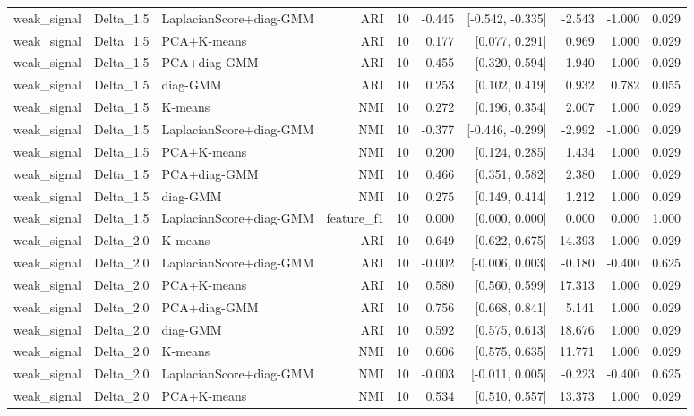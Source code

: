 \begin{table}[t]
\begin{tabular}{lllrrrrrr}
weak\_signal & Delta\_1.5 & LaplacianScore+diag-GMM & ARI & 10 & -0.445 & [-0.542, -0.335] & -2.543 & -1.000 & 0.029 \\
weak\_signal & Delta\_1.5 & PCA+K-means & ARI & 10 & 0.177 & [0.077, 0.291] & 0.969 & 1.000 & 0.029 \\
weak\_signal & Delta\_1.5 & PCA+diag-GMM & ARI & 10 & 0.455 & [0.320, 0.594] & 1.940 & 1.000 & 0.029 \\
weak\_signal & Delta\_1.5 & diag-GMM & ARI & 10 & 0.253 & [0.102, 0.419] & 0.932 & 0.782 & 0.055 \\
weak\_signal & Delta\_1.5 & K-means & NMI & 10 & 0.272 & [0.196, 0.354] & 2.007 & 1.000 & 0.029 \\
weak\_signal & Delta\_1.5 & LaplacianScore+diag-GMM & NMI & 10 & -0.377 & [-0.446, -0.299] & -2.992 & -1.000 & 0.029 \\
weak\_signal & Delta\_1.5 & PCA+K-means & NMI & 10 & 0.200 & [0.124, 0.285] & 1.434 & 1.000 & 0.029 \\
weak\_signal & Delta\_1.5 & PCA+diag-GMM & NMI & 10 & 0.466 & [0.351, 0.582] & 2.380 & 1.000 & 0.029 \\
weak\_signal & Delta\_1.5 & diag-GMM & NMI & 10 & 0.275 & [0.149, 0.414] & 1.212 & 1.000 & 0.029 \\
weak\_signal & Delta\_1.5 & LaplacianScore+diag-GMM & feature\_f1 & 10 & 0.000 & [0.000, 0.000] & 0.000 & 0.000 & 1.000 \\
weak\_signal & Delta\_2.0 & K-means & ARI & 10 & 0.649 & [0.622, 0.675] & 14.393 & 1.000 & 0.029 \\
weak\_signal & Delta\_2.0 & LaplacianScore+diag-GMM & ARI & 10 & -0.002 & [-0.006, 0.003] & -0.180 & -0.400 & 0.625 \\
weak\_signal & Delta\_2.0 & PCA+K-means & ARI & 10 & 0.580 & [0.560, 0.599] & 17.313 & 1.000 & 0.029 \\
weak\_signal & Delta\_2.0 & PCA+diag-GMM & ARI & 10 & 0.756 & [0.668, 0.841] & 5.141 & 1.000 & 0.029 \\
weak\_signal & Delta\_2.0 & diag-GMM & ARI & 10 & 0.592 & [0.575, 0.613] & 18.676 & 1.000 & 0.029 \\
weak\_signal & Delta\_2.0 & K-means & NMI & 10 & 0.606 & [0.575, 0.635] & 11.771 & 1.000 & 0.029 \\
weak\_signal & Delta\_2.0 & LaplacianScore+diag-GMM & NMI & 10 & -0.003 & [-0.011, 0.005] & -0.223 & -0.400 & 0.625 \\
weak\_signal & Delta\_2.0 & PCA+K-means & NMI & 10 & 0.534 & [0.510, 0.557] & 13.373 & 1.000 & 0.029 \\

\end{tabular}
\end{table}
